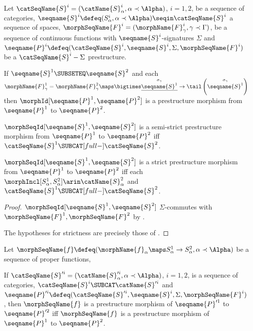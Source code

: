 \documentclass{article}
\begin{document}
\begin{lemma}
\label{lem:premorph}
Let $\catSeqName{S}^i=(\catName{S}^i_\alpha, \alpha \prec \Alpha)$,
$i = 1,2$, be a sequence of categories,
$
  \seqname{S}^i \defeq (S^i_\alpha, \alpha \prec \Alpha)
  \seqin \catSeqName{S}^i
$
a sequence of spaces,
$\morphSeqName{F}^i=(\morphName{F}^i_\gamma, \gamma \prec \Gamma)$,
be a sequence of continuous functions with
$\seqname{S}^i$-signatures $\Sigma$ and
$
  \seqname{P}^i \defeq
  (\catSeqName{S}^i, \seqname{S}^i, \Sigma, \morphSeqName{F}^i)
$
be a $\catSeqName{S}^i-\Sigma$ prestructure.

If $\seqname{S}^1 \SUBSETEQ \seqname{S}^2$ and each
$
  \morphName{F}^1_\gamma =
  \morphName{F}^2_\gamma \maps
    \bigtimes \underline{\overset{\sigma_\gamma}{\seqname{S}^1}} \to
    \tail \left ( \overset{\sigma_\gamma}{\seqname{S}^1} \right )
$
then $\morphId[{{\seqname{P}^1},{\seqname{P}^2}}]$ is a prestructure morphism from
$\seqname{P}^1$ to $\seqname{P}^2$.

$\morphSeqId[{{\seqname{S}^1},{\seqname{S}^2}}]$ is a semi-strict prestructure
morphism from $\seqname{P}^1$ to $\seqname{P}^2$ iff
$\catSeqName{S}^1 \SUBCAT[full-] \catSeqName{S}^2$.

$\morphSeqId[{{\seqname{S}^1},{\seqname{S}^2}}]$ is a strict prestructure
morphism from $\seqname{P}^1$ to $\seqname{P}^2$ iff each \\
$\morphIncl[{S^1_\alpha},{S^2_\alpha}] \arin \catName{S}^2_\alpha$ and
$\catSeqName{S}^1 \SUBCAT[full-] \catSeqName{S}^2$.

\begin{proof}
$\morphSeqId[{{\seqname{S}^1},{\seqname{S}^2}}]$ $\Sigma$-commutes with
$\morphSeqName{F}^1,\morphSeqName{F}^2$ by
.

The hypotheses for strictness are precisely those of
.
\end{proof}

Let
$
  \morphSeqName{f} \defeq
  (
    \morphName{f}_\alpha \maps S^1_\alpha \to S^2_\alpha,
    \alpha \prec \Alpha
  )
$
be a sequence of proper functions,

If $\catSeqName{S}'^i=(\catName{S}'^i_\alpha, \alpha \prec \Alpha)$,
$i = 1,2$, is a sequence of categories,
$\catSeqName{S}^i \SUBCAT \catName{S}'^i$ and
$
  \seqname{P}'^i \defeq
  (\catSeqName{S}'^i, \seqname{S}^i, \Sigma, \morphSeqName{F}^i)
$,
then $\morphSeqName{f}$ is a prestructure morphism of $\seqname{P}'^1$
to $\seqname{P}'^2$ iff $\morphSeqName{f}$ is a
prestructure morphism of $\seqname{P}^1$ to
$\seqname{P}^2$.


\end{lemma}
\end{document}
